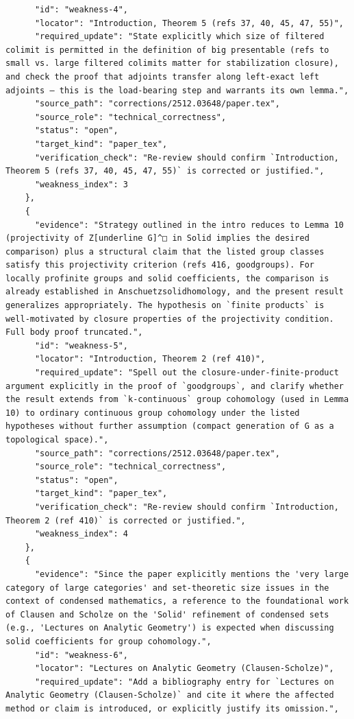 \documentclass[11pt]{article}
\begin{document}
\begin{verbatim}
      "id": "weakness-4",
      "locator": "Introduction, Theorem 5 (refs 37, 40, 45, 47, 55)",
      "required_update": "State explicitly which size of filtered colimit is permitted in the definition of big presentable (refs to small vs. large filtered colimits matter for stabilization closure), and check the proof that adjoints transfer along left-exact left adjoints — this is the load-bearing step and warrants its own lemma.",
      "source_path": "corrections/2512.03648/paper.tex",
      "source_role": "technical_correctness",
      "status": "open",
      "target_kind": "paper_tex",
      "verification_check": "Re-review should confirm `Introduction, Theorem 5 (refs 37, 40, 45, 47, 55)` is corrected or justified.",
      "weakness_index": 3
    },
    {
      "evidence": "Strategy outlined in the intro reduces to Lemma 10 (projectivity of Z[underline G]^□ in Solid implies the desired comparison) plus a structural claim that the listed group classes satisfy this projectivity criterion (refs 416, goodgroups). For locally profinite groups and solid coefficients, the comparison is already established in Anschuetzsolidhomology, and the present result generalizes appropriately. The hypothesis on `finite products` is well-motivated by closure properties of the projectivity condition. Full body proof truncated.",
      "id": "weakness-5",
      "locator": "Introduction, Theorem 2 (ref 410)",
      "required_update": "Spell out the closure-under-finite-product argument explicitly in the proof of `goodgroups`, and clarify whether the result extends from `k-continuous` group cohomology (used in Lemma 10) to ordinary continuous group cohomology under the listed hypotheses without further assumption (compact generation of G as a topological space).",
      "source_path": "corrections/2512.03648/paper.tex",
      "source_role": "technical_correctness",
      "status": "open",
      "target_kind": "paper_tex",
      "verification_check": "Re-review should confirm `Introduction, Theorem 2 (ref 410)` is corrected or justified.",
      "weakness_index": 4
    },
    {
      "evidence": "Since the paper explicitly mentions the 'very large category of large categories' and set-theoretic size issues in the context of condensed mathematics, a reference to the foundational work of Clausen and Scholze on the 'Solid' refinement of condensed sets (e.g., 'Lectures on Analytic Geometry') is expected when discussing solid coefficients for group cohomology.",
      "id": "weakness-6",
      "locator": "Lectures on Analytic Geometry (Clausen-Scholze)",
      "required_update": "Add a bibliography entry for `Lectures on Analytic Geometry (Clausen-Scholze)` and cite it where the affected method or claim is introduced, or explicitly justify its omission.",

\end{verbatim}
\end{document}
